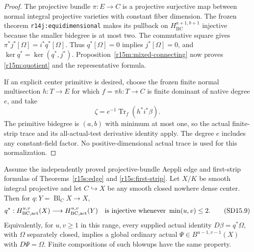 \begin{proof}
The projective bundle $\pi:E\to C$ is a projective
surjective map between normal integral projective varieties
with constant fiber dimension.  The frozen theorem
\texttt{r14j:equidimensional} makes its pullback on
$H_{\mathrm{BC}}^{a+1,b+1}$ injective because the smaller
bidegree is at most two.  The commutative square gives
$\pi^*j^*[\Omega]=i^*q^*[\Omega]$.
Thus $q^*[\Omega]=0$ implies $j^*[\Omega]=0$, and
$\ker q^*=\ker(q^*,j^*)$.
Proposition~\ref{r15m:mixed-connecting} now proves
\eqref{r15m:quotient} and the representative formula.

If an explicit center primitive is desired, choose the
frozen finite normal multisection $h:T\to E$ for which
$f=\pi h:T\to C$ is finite dominant of native degree
$e$, and take
\[
                   \zeta=e^{-1}\operatorname{Tr}_f(h^*i^*\beta).
\]
The primitive bidegree is $(a,b)$ with minimum at most
one, so the actual finite-strip trace and its all-actual-test
derivative identity apply.  The degree $e$ includes any
constant-field factor.  No positive-dimensional actual
trace is used for this normalization.
\end{proof}

\begin{theorem}
\label{r15m:strip-injectivity}
Assume the independently proved projective-bundle Aeppli
edge and first-strip formulas of
Theorems~\ref{r15s:edge} and \ref{r15s:first-strip}.
Let $X/K$ be smooth integral projective and let
$C\hookrightarrow X$ be any smooth closed nowhere dense
center.  Then for $q:Y=\operatorname{Bl}_C X\to X$,
\[
                  q^*:H_{\mathrm{BC,act}}^{u,v}(X)
                          \longrightarrow H_{\mathrm{BC,act}}^{u,v}(Y)
                  \quad\hbox{is injective whenever }\min(u,v)\leq2.
\tag{SD15.9}\label{r15m:strip-injection}
\]
Equivalently, for $u,v\geq1$ in this range, every supplied
actual identity $D\beta=q^*\Omega$, with $\Omega$
separately closed, implies a global ordinary actual
$\Psi\in B^{u-1,v-1}(X)$ with $D\Psi=\Omega$.
Finite compositions of such blowups have the same property.
\end{theorem}

